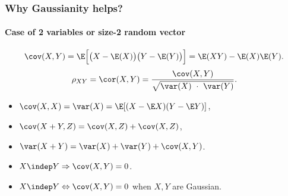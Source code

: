 \begin{frame}
  \frametitle{Why Gaussianity helps?}
  \framesubtitle{Case of 2 variables or size-2 random vector}

  \begin{definitions}
    \vspace{-.75cm}
    \begin{equation*}
      \cov(X,Y)   =  \E\Big[\big(X-\E(X)\big)\big(Y-\E(Y)\big)\Big]  =
      \E(XY) - \E(X)\E(Y).
    \end{equation*}
    \begin{equation*}
      \rho_{XY} = \cor(X,Y) = \frac{\cov(X,Y)}{\sqrt{\var(X) \ \cdot \ \var(Y)}}.
    \end{equation*}
  \end{definitions}
  
  \begin{proposition}
    \begin{itemize}
    \item $\cov(X,X) = \var(X) = \E[(X-\E X)(Y-\E Y)]$,
    \item $\cov(X+Y,Z) = \cov(X,Z) + \cov(X,Z)$,
    \item $\var(X+Y) = \var(X) + \var(Y) + \cov(X,Y)$.
    \item $X \indep Y \Rightarrow\cov(X,Y) = 0$.
    \item<2> \alert{$X  \indep Y  \Leftrightarrow \cov(X,Y) =  0$ when
        $X,Y$ are Gaussian}.
    \end{itemize}
  \end{proposition}
\end{frame}

